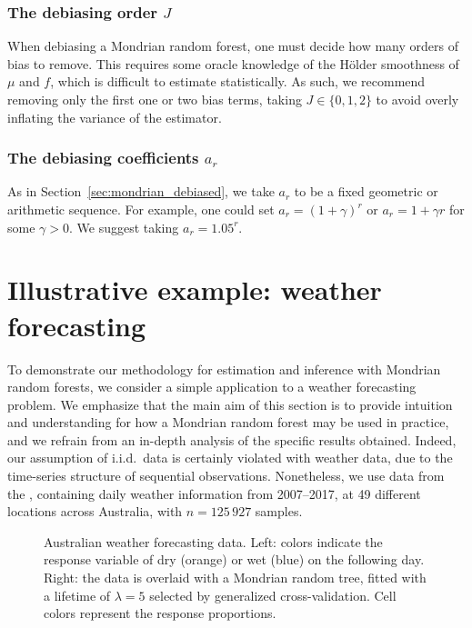 \documentclass[11pt,lof]{puthesis}
\theoremstyle{break}
\theoremstyle{proof}
\begin{document}
\subsubsection*{The debiasing order \texorpdfstring{$J$}{J}}%

When debiasing a Mondrian random forest, one must decide
how many orders of bias to remove. This requires some
oracle knowledge of the H{\"o}lder smoothness of $\mu$ and $f$, which is
difficult to estimate statistically. As such, we recommend
removing only the first one or two bias terms, taking $J \in \{0,1,2\}$ to
avoid overly inflating the variance of the estimator.

\subsubsection*{The debiasing coefficients \texorpdfstring{$a_r$}{ar}}%

As in Section~\ref{sec:mondrian_debiased}, we take $a_r$ to be a fixed
geometric or arithmetic sequence. For example, one could set
$a_r = (1+\gamma)^r$ or $a_r = 1 + \gamma r$ for some $\gamma > 0$.
We suggest taking $a_r = 1.05^r$.

\section{Illustrative example: weather forecasting}%
\label{sec:mondrian_weather}

To demonstrate our methodology for estimation and inference with Mondrian random
forests, we consider a simple application
to a weather forecasting problem. We emphasize that the main aim of this
section is to provide intuition and understanding for how a Mondrian random
forest may be used in practice, and we refrain from an in-depth analysis of the
specific results obtained. Indeed, our assumption of i.i.d.\ data is
certainly violated with weather data, due to the time-series
structure of sequential observations.
Nonetheless, we use data from the \citet{bureau2017daily}, containing daily
weather information from 2007--2017, at 49 different
locations across Australia, with $n = 125\,927$ samples.

\begin{figure}[b!]
  \centering
  \begin{subfigure}{0.49\textwidth}
    \centering
  \end{subfigure}
  \begin{subfigure}{0.49\textwidth}
    \centering
  \end{subfigure}
  \caption[Australian weather forecasting data]{
    Australian weather forecasting data. Left: colors indicate the response
    variable of dry (orange) or wet (blue) on the following
    day. Right: the data is overlaid with a Mondrian random tree,
    fitted with a lifetime of $\lambda = 5$
    selected by generalized cross-validation. Cell colors represent the response
  proportions.}
  \label{fig:mondrian_weather_data}
\end{figure}
\end{document}
